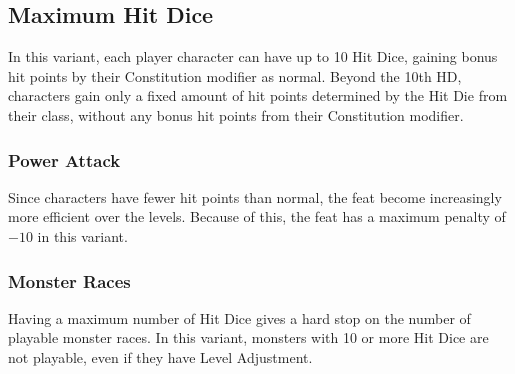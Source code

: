 \subsection{Maximum Hit Dice}
In this variant, each player character can have up to 10 Hit Dice, gaining bonus hit points by their Constitution modifier as normal. Beyond the 10th HD, characters gain only a fixed amount of hit points determined by the Hit Die from their class, without any bonus hit points from their Constitution modifier.


\subsubsection{Power Attack}
Since characters have fewer hit points than normal, the  feat become increasingly more efficient over the levels. Because of this, the  feat has a maximum penalty of $-10$ in this variant.

\subsubsection{Monster Races}
Having a maximum number of Hit Dice gives a hard stop on the number of playable monster races. In this variant, monsters with 10 or more Hit Dice are not playable, even if they have Level Adjustment.